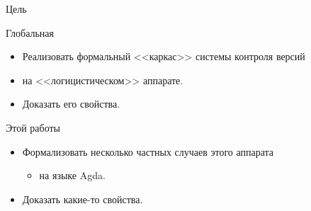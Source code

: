 \begin{frame}{Цель}
  \begin{block}{Глобальная}
  \begin{itemize}
  \item Реализовать формальный <<каркас>> системы контроля версий
  \item на <<логицистическом>> аппарате.
  \item Доказать его свойства.
  \end{itemize}
  \end{block}

  \begin{block}{Этой работы}
  \begin{itemize}
  \item Формализовать несколько частных случаев этого аппарата
    \begin{itemize}
    \item на языке Agda.
    \end{itemize}
  \item Доказать какие-то свойства.
  \end{itemize}
  \end{block}
\end{frame}
